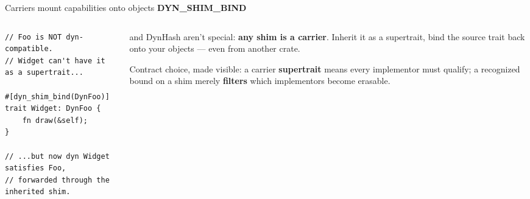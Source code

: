 \documentclass[aspectratio=169,11pt,t]{beamer}
\newcommand{\code}[1]{{\ttfamily\small\color{oxidesoft}#1}}
\newcommand{\eyebrow}[2][steel]{{\ttfamily\scriptsize\bfseries\color{#1}\MakeUppercase{#2}}\par\vspace{0.4em}}
\newcommand{\ledesm}[1]{{\color{muted}\fontsize{11.3}{16}\selectfont #1\par}}
\newcommand{\tx}[1]{{\color{text}\bfseries#1}}
\begin{document}
\begin{frame}[fragile]{Carriers mount capabilities onto objects}
\eyebrow[oxide]{dyn\_shim\_bind}
\begin{columns}[T]
\begin{column}{0.5\textwidth}
\begin{lstlisting}
// Foo is NOT dyn-compatible.
// Widget can't have it as a supertrait...

#[dyn_shim_bind(DynFoo)]
trait Widget: DynFoo {
    fn draw(&self);
}

// ...but now dyn Widget satisfies Foo,
// forwarded through the inherited shim.
\end{lstlisting}
\end{column}
\begin{column}{0.5\textwidth}
\ledesm{\code{DynClone} and \code{DynHash} aren't special: \tx{any shim is a carrier}. Inherit it as a supertrait, bind the source trait back onto your objects --- even from another crate.}
\vspace{0.8em}
\ledesm{Contract choice, made visible: a carrier \tx{supertrait} means every implementor must qualify; a recognized bound on a shim merely \tx{filters} which implementors become erasable.}
\end{column}
\end{columns}
\end{frame}
\end{document}
